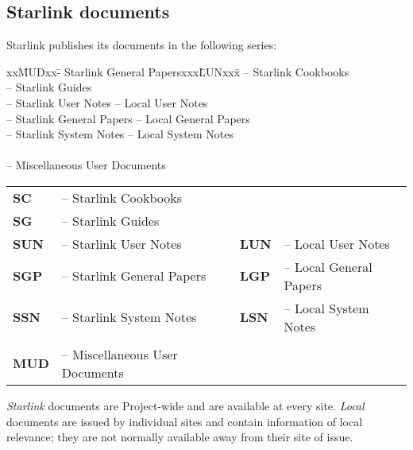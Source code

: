 \documentclass[twoside]{article}
\newcommand{\htmladdnormallink}[2]{#1}
\newenvironment{latexonly}{}{}
\begin{document}
\newpage

\subsection{Starlink documents}

Starlink publishes its
\htmladdnormallink{documents}{http://www.starlink.ac.uk/docscode.html}
in the following series:

\begin{latexonly}
{\small
\begin{tabbing}
xx\=MUDxx\=- Starlink General Papersxxx\=LUNxx\=x\kill
{}\>-- Starlink Cookbooks\\
\>-- Starlink Guides\\
\>-- Starlink User Notes     \>-- Local User Notes\\
\>-- Starlink General Papers \>-- Local General Papers\\
\>-- Starlink System Notes   \>-- Local System Notes\\
\\
\>-- Miscellaneous User Documents
\end{tabbing}
}
\end{latexonly}

\begin{htmlonly}
\begin{tabular}{llll}
{\bf SC}   & -- Starlink Cookbooks      &           & \\
{\bf SG}   & -- Starlink Guides         &           & \\
{\bf SUN}  & -- Starlink User Notes     & {\bf LUN} & -- Local User Notes\\
{\bf SGP}  & -- Starlink General Papers & {\bf LGP} & -- Local General Papers\\
{\bf SSN}  & -- Starlink System Notes   & {\bf LSN} & -- Local System Notes\\
\\
{\bf MUD}  & -- Miscellaneous User Documents &     &
\end{tabular}
\smallskip
\end{htmlonly}


{\em Starlink}\/ documents are Project-wide and are available at every site.
{\em Local}\/ documents are issued by individual sites and contain information
of local relevance; they are not normally available away from their site of
issue.
\end{document}
